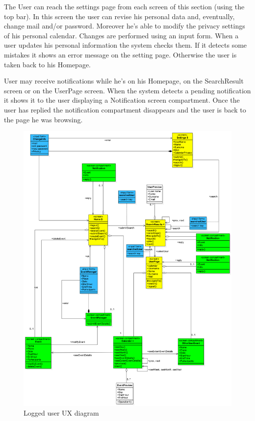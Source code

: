 \documentclass[10pt,a4paper,titlepage]{article}
\begin{document}
The User can reach the settings page from each screen of this section (using the top bar). In this screen the user can revise his personal data and, eventually, change mail and/or password. Moreover he’s able to modify the privacy settings of his personal calendar. Changes are performed using an input form. 
When a user updates his personal information the system checks them. If it detects some mistakes  it shows an error message on the setting page. Otherwise the user is taken back to his Homepage.

User may receive notifications while he’s on his Homepage, on the SearchResult screen or on the UserPage screen. When the system detects a pending notification it shows it to the user displaying a Notification screen compartment. Once the user has replied the notification compartment disappears and the user is back to the page he was browsing.

\begin{figure}[h]
\centering
\includegraphics[width=\linewidth]{./images/UX_logged}
\caption[Logged ux]{Logged user UX diagram}
\label{fig:UX_logged}
\end{figure}
\end{document}
